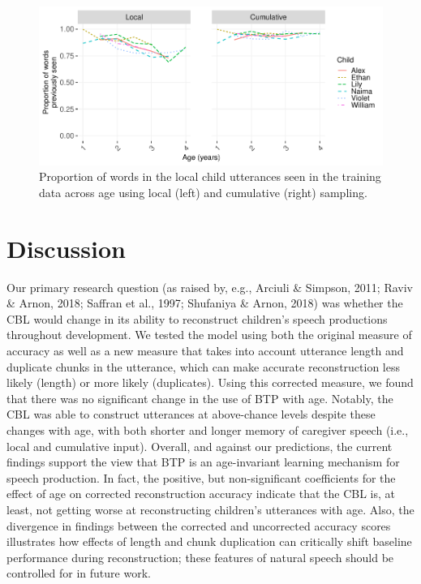 \documentclass[
  english,
  man,floatsintext]{apa6}
\begin{document}
\begin{figure}
\includegraphics[width=0.95\linewidth]{CBL-age_invariance_files/figure-latex/fig7-1} \caption{Proportion of words in the local child utterances seen in the training data across age using local (left) and cumulative (right) sampling.}\label{fig:fig7}
\end{figure}

\hypertarget{discussion}{%
\section{Discussion}\label{discussion}}

Our primary research question (as raised by, e.g., Arciuli \& Simpson, 2011; Raviv \& Arnon, 2018; Saffran et al., 1997; Shufaniya \& Arnon, 2018) was whether the CBL would change in its ability to reconstruct children's speech productions throughout development. We tested the model using both the original measure of accuracy as well as a new measure that takes into account utterance length and duplicate chunks in the utterance, which can make accurate reconstruction less likely (length) or more likely (duplicates). Using this corrected measure, we found that there was no significant change in the use of BTP with age. Notably, the CBL was able to construct utterances at above-chance levels despite these changes with age, with both shorter and longer memory of caregiver speech (i.e., local and cumulative input). Overall, and against our predictions, the current findings support the view that BTP is an age-invariant learning mechanism for speech production. In fact, the positive, but non-significant coefficients for the effect of age on corrected reconstruction accuracy indicate that the CBL is, at least, not getting worse at reconstructing children's utterances with age. Also, the divergence in findings between the corrected and uncorrected accuracy scores illustrates how effects of length and chunk duplication can critically shift baseline performance during reconstruction; these features of natural speech should be controlled for in future work.
\end{document}

